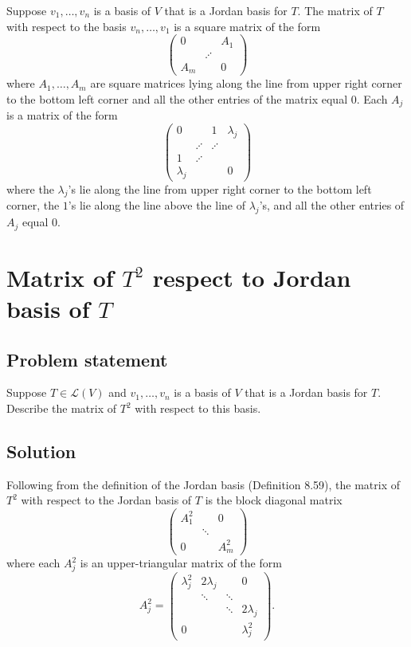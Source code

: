 \documentclass{article}
\begin{document}
Suppose $v_1,\dots,v_n$ is a basis of $V$ that is a Jordan basis for $T$. The matrix of $T$ with respect to the basis $v_n,\ldots,v_1$ is a square matrix of the form
\begin{equation*}
\begin{pmatrix}
0 & & A_1\\
& \iddots & \\
A_m & & 0
\end{pmatrix}
\end{equation*}
where $A_1,\ldots,A_m$ are square matrices lying along the line from upper right corner to the bottom left corner and all the other entries of the matrix equal $0$. Each $A_j$ is a matrix of the form
\begin{equation*}
\begin{pmatrix}
0 & & 1 &\lambda_j\\
& \iddots & \iddots & \\
1 & \iddots & & \\
\lambda_j & & & 0
\end{pmatrix}
\end{equation*}
where the $\lambda_j$'s lie along the line from upper right corner to the bottom left corner, the $1$'s lie along the line above the line of $\lambda_j$'s, and all the other entries of $A_j$ equal $0$.

\clearpage

\section{Matrix of $T^2$ respect to Jordan basis of $T$}
\subsection*{Problem statement}
Suppose $T\in\mathcal{L}(V)$ and $v_1,\ldots,v_n$ is a basis of $V$ that is a Jordan basis for $T$. Describe the matrix of $T^2$ with respect to this basis.

\subsection*{Solution}
Following from the definition of the Jordan basis (Definition 8.59), the matrix of $T^2$ with respect to the Jordan basis of $T$ is the block diagonal matrix
\begin{equation*}
\begin{pmatrix}
A_1^2 & & 0\\
& \ddots & \\
0 & & A_m^2
\end{pmatrix}
\end{equation*}
where each $A_j^2$ is an upper-triangular matrix of the form
\begin{equation*}
A_j^2=\begin{pmatrix}
\lambda_j^2 & 2\lambda_j & & 0 \\
& \ddots & \ddots & \\
& & \ddots & 2\lambda_j \\
0 & & & \lambda_j^2
\end{pmatrix}.
\end{equation*}
\end{document}
